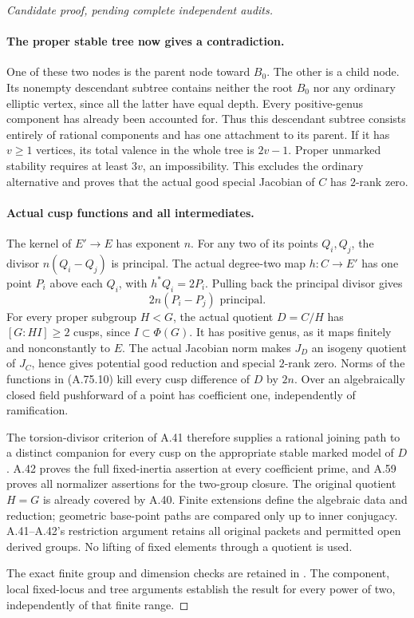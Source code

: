 \begin{proof}[Candidate proof, pending complete independent audits]
\paragraph{The proper stable tree now gives a contradiction.}
One of these two nodes is the parent node toward \(B_0\).
The other is a child node. Its nonempty descendant subtree
contains neither the root \(B_0\) nor any ordinary
elliptic vertex, since all the latter have equal depth.
Every positive-genus component has already been accounted
for. Thus this descendant subtree consists entirely of
rational components and has one attachment to its parent.
If it has \(v\ge1\) vertices, its total valence in the
whole tree is \(2v-1\). Proper unmarked stability requires
at least \(3v\), an impossibility. This excludes the
ordinary alternative and proves that the actual good
special Jacobian of \(C\) has \(2\)-rank zero.

\paragraph{Actual cusp functions and all intermediates.}
The kernel of \(E'\to E\) has exponent \(n\). For
any two of its points \(Q_i,Q_j\), the divisor
\(n(Q_i-Q_j)\) is principal. The actual degree-two map
\(h:C\to E'\) has one point \(P_i\) above each
\(Q_i\), with \(h^*Q_i=2P_i\). Pulling back the
principal divisor gives
\[
                     2n(P_i-P_j)\text{ principal}.
                                                        \tag{A.75.10}
\]
For every proper subgroup \(H<G\), the actual quotient
\(D=C/H\) has \([G:HI]\ge2\) cusps, since
\(I\subset\Phi(G)\). It has positive genus, as it
maps finitely and nonconstantly to \(E\). The actual
Jacobian norm makes \(J_D\) an isogeny quotient of
\(J_C\), hence gives potential good reduction and
special \(2\)-rank zero. Norms of the functions in
(A.75.10) kill every cusp difference of \(D\) by
\(2n\). Over an algebraically closed field pushforward
of a point has coefficient one, independently of ramification.

The torsion-divisor criterion of A.41 therefore supplies
a rational joining path to a distinct companion for every
cusp on the appropriate stable marked model of \(D\).
A.42 proves the full fixed-inertia assertion at every
coefficient prime, and A.59 proves all normalizer assertions
for the two-group closure. The original quotient \(H=G\)
is already covered by A.40. Finite extensions define the
algebraic data and reduction; geometric base-point paths
are compared only up to inner conjugacy. A.41--A.42's
restriction argument retains all original packets and
permitted open derived groups. No lifting of fixed elements
through a quotient is used.

The exact finite group and dimension checks are retained
in . The component,
local fixed-locus and tree arguments establish the result
for every power of two, independently of that finite range.
\end{proof}
